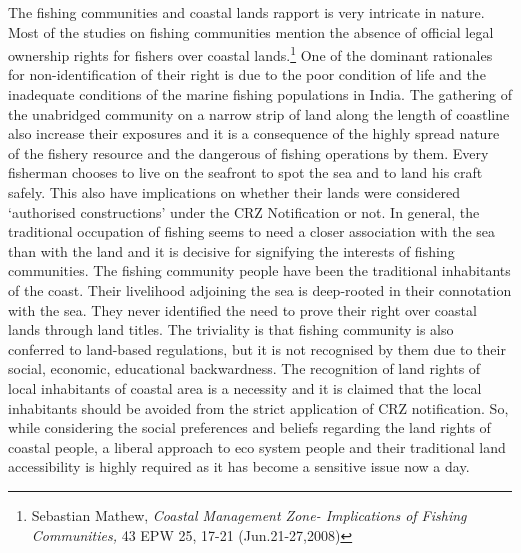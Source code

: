 \begin{multicols}{2}
\noi
The fishing communities and coastal lands rapport is very intricate in nature. Most of the
studies on fishing communities mention the absence of official legal ownership rights for
fishers over coastal lands.\footnote{Sebastian Mathew, \textit{Coastal Management Zone- Implications of Fishing Communities,} 43 EPW 25, 17-21 (Jun.21-27,2008)} One of the dominant rationales for non-identification of their right is due to the poor condition of life and the inadequate conditions of the marine fishing populations in India. The gathering of the unabridged community on a narrow strip of land
along the length of coastline also increase their exposures and it is a consequence of the
highly spread nature of the fishery resource and the dangerous of fishing operations by them.
Every fisherman chooses to live on the seafront to spot the sea and to land his craft safely.
This also have implications on whether their lands were considered ‘authorised constructions’
under the CRZ Notification or not. In general, the traditional occupation of fishing seems to
need a closer association with the sea than with the land and it is decisive for signifying the
interests of fishing communities. The fishing community people have been the traditional
inhabitants of the coast. Their livelihood adjoining the sea is deep-rooted in their connotation
with the sea. They never identified the need to prove their right over coastal lands through
land titles. The triviality is that fishing community is also conferred to land-based
regulations, but it is not recognised by them due to their social, economic, educational
backwardness. The recognition of land rights of local inhabitants of coastal area is a necessity
and it is claimed that the local inhabitants should be avoided from the strict application of
CRZ notification. So, while considering the social preferences and beliefs regarding the land
rights of coastal people, a liberal approach to eco system people and their traditional land
accessibility is highly required as it has become a sensitive issue now a day.



\end{multicols}
